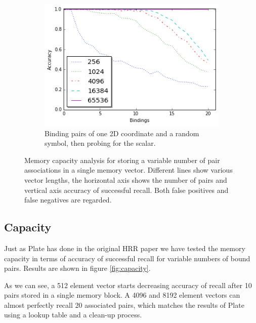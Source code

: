 \documentclass[journal]{journal}
\begin{document}
\begin{figure}[th!]
\begin{subfigure}{0.45\columnwidth}
				\includegraphics[width=1\columnwidth]{img/capacity_coordinate.png}
				\caption{Binding pairs of one 2D coordinate and a random symbol, then probing for the scalar.}
				\label{fig:capacity_coordinate}
			\end{subfigure}	
			\caption{Memory capacity analysis for storing a variable number of pair associations in a single memory vector. Different lines show various vector lengths, the horizontal axis shows the number of pairs and vertical axis accuracy of successful recall. Both false positives and false negatives are regarded.}
		\end{figure}	
	
	
	\subsection{Capacity}
	
	Just as Plate has done in the original HRR paper \cite{Plate:1995:HolographicReducedRepresentations} we have tested the memory capacity in terms of accuracy of successful recall for variable numbers of bound pairs. Results are shown in figure \ref{fig:capacity}.
	
	As we can see, a 512 element vector starts decreasing accuracy of recall after 10 pairs stored in a single memory block. A 4096 and 8192 element vectors can almost perfectly recall 20 associated pairs, which matches the results of Plate using a lookup table and a clean-up process. 
	
\end{document}
